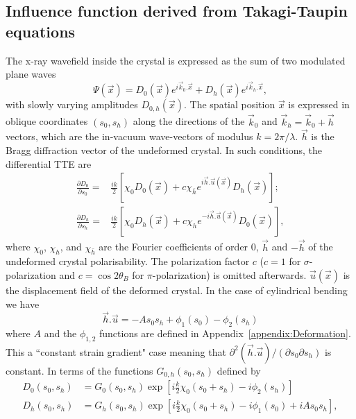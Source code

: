 \documentclass[preprint]{iucr}              %
\newcommand{\inred}[1]{{\color{red}#1}}
\begin{document}
\subsection{Influence function derived from Takagi-Taupin equations}
\label{sec:influence}

The x-ray wavefield inside the crystal is expressed as the sum of two modulated plane waves
\begin{equation}
    \Psi(\vec x) = D_0(\vec x) e^{i \vec k_0 . \vec x} + D_h(\vec x) e^{i \vec k_h . \vec x},
\end{equation}
with slowly varying amplitudes $D_{0,h}(\vec x)$.
The spatial position $\vec x$ is expressed in oblique coordinates $(s_0,s_h)$ along the directions of the $\vec k_0$ and $\vec k_h=\vec k_0 + \vec h$ vectors, which are the in-vacuum wave-vectors \inred{of} modulus $k=2\pi/\lambda$. $\vec{h}$ is the Bragg diffraction vector of the undeformed crystal. In such conditions, the differential TTE are
\begin{subequations}
\label{eq:TT}
\begin{align}
\frac{\partial D_0}{\partial s_0} =& \frac{ik}{2} \left[ \chi_0 D_0(\vec x)+c \chi_{\bar h} e^{i \vec h . \vec u (\vec x)} D_h(\vec x) \right]; \\
\frac{\partial D_h}{\partial s_h} =& \frac{ik}{2} \left[ \chi_0 D_h(\vec x)+c \chi_{h} e^{-i \vec h . \vec u (\vec x)} D_0(\vec x) \right],
\end{align}
\end{subequations}
where $\chi_0$, $\chi_h$, and $\chi_{\bar h}$ are the Fourier coefficients of order 0, $\vec h$ and $-\vec h$ of the undeformed crystal polarisability. The polarization factor $c$ ($c=1$ for $\sigma$-polarization and $c=\cos2\theta_B$  for $\pi$-polarization) is omitted afterwards. 
$\vec u (\vec x)$ is the displacement field of the deformed crystal.
In the case of cylindrical bending we have
\begin{equation}
\label{eq:cylinder}
    \vec h . \vec u = -A s_0 s_h + \phi_1(s_0) - \phi_2(s_h)
\end{equation}
where $A$ and the $\phi_{1,2}$ functions are defined in Appendix~\ref{appendix:Deformation}.
This a 
``constant strain gradient" case \cite{authierbook} meaning that $\partial^2(\vec h . \vec u)/(\partial s_0 \partial s_h)$ is constant. In terms of the functions $G_{0,h}(s_0,s_h)$ defined by
\begin{subequations}
    \label{eq:functionsG}
    \begin{align}
      D_0(s_0,s_h) &= G_0(s_0,s_h) \exp[i\frac{k}{2}\chi_0 (s_0+s_h)-i \phi_2(s_h)]\\
      D_h(s_0,s_h) &= G_h(s_0,s_h) \exp[i\frac{k}{2}\chi_0 (s_0+s_h)-i \phi_1(s_0)+iAs_0s_h],
    \end{align}
\end{subequations}
\end{document}
